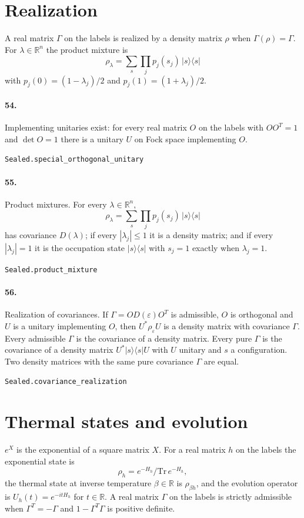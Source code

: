 \documentclass[11pt]{article}
\begin{document}
\section*{Realization}
A real matrix $\Gamma$ on the labels is realized by a density matrix $\rho$ when $\Gamma(\rho) = \Gamma$. For $\lambda \in \mathbb R^n$ the product mixture is \[\rho_\lambda = \sum_s \prod_j p_j(s_j)\, |s\rangle\langle s|\] with $p_j(0) = (1 - \lambda_j)/2$ and $p_j(1) = (1 + \lambda_j)/2$.

\paragraph{54.} Implementing unitaries exist: for every real matrix $O$ on the labels with $O O^T = 1$ and $\det O = 1$ there is a unitary $U$ on Fock space implementing $O$.\par{\footnotesize\texttt{Sealed.special\_orthogonal\_unitary}}

\paragraph{55.} Product mixtures. For every $\lambda \in \mathbb R^n$, \[\rho_\lambda = \sum_s \prod_j p_j(s_j)\,|s\rangle\langle s|\] has covariance $D(\lambda)$; if every $|\lambda_j| \le 1$ it is a density matrix; and if every $|\lambda_j| = 1$ it is the occupation state $|s\rangle\langle s|$ with $s_j = 1$ exactly when $\lambda_j = 1$.\par{\footnotesize\texttt{Sealed.product\_mixture}}

\paragraph{56.} Realization of covariances. If $\Gamma = O D(\varepsilon) O^T$ is admissible, $O$ is orthogonal and $U$ is a unitary implementing $O$, then $U^* \rho_\varepsilon U$ is a density matrix with covariance $\Gamma$. Every admissible $\Gamma$ is the covariance of a density matrix. Every pure $\Gamma$ is the covariance of a density matrix $U^*|s\rangle\langle s|U$ with $U$ unitary and $s$ a configuration. Two density matrices with the same pure covariance $\Gamma$ are equal.\par{\footnotesize\texttt{Sealed.covariance\_realization}}

\section*{Thermal states and evolution}
$e^X$ is the exponential of a square matrix $X$. For a real matrix $h$ on the labels the exponential state is \[\rho_h = e^{-H_h} / \mathrm{Tr}\, e^{-H_h},\] the thermal state at inverse temperature $\beta \in \mathbb R$ is $\rho_{\beta h}$, and the evolution operator is $U_h(t) = e^{-itH_h}$ for $t \in \mathbb R$. A real matrix $\Gamma$ on the labels is strictly admissible when $\Gamma^T = -\Gamma$ and $1 - \Gamma^T\Gamma$ is positive definite.
\end{document}
